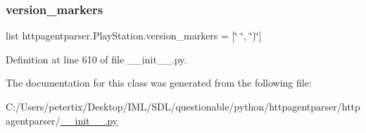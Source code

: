 \subsubsection{\texorpdfstring{version\+\_\+markers}{version\_markers}}
{\footnotesize\ttfamily list httpagentparser.\+Play\+Station.\+version\+\_\+markers = \mbox{[}\char`\"{} \char`\"{}, \char`\"{})\char`\"{}\mbox{]}\hspace{0.3cm}{\ttfamily [static]}}



Definition at line 610 of file \+\_\+\+\_\+init\+\_\+\+\_\+.\+py.



The documentation for this class was generated from the following file\+:\begin{DoxyCompactItemize}
\item 
C\+:/\+Users/petertix/\+Desktop/\+I\+M\+L/\+S\+D\+L/questionable/python/httpagentparser/httpagentparser/\hyperlink{____init_____8py}{\+\_\+\+\_\+init\+\_\+\+\_\+.\+py}\end{DoxyCompactItemize}
